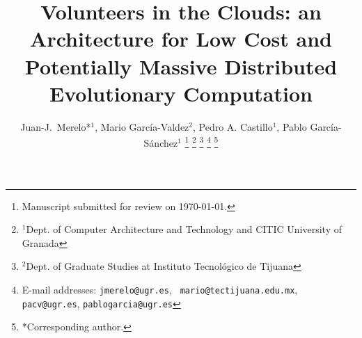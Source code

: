 \documentclass[journal,onecolumn]{IEEEtran}
\begin{document}
\title{Volunteers in the Clouds: an Architecture for Low Cost and
  Potentially Massive Distributed Evolutionary Computation}



\author{Juan-J.~Merelo*$^1$, Mario Garc\'ia-Valdez$^2$, Pedro A. Castillo$^1$, Pablo Garc\'ia-S\'anchez$^1$
\thanks{Manuscript submitted for review on \today.}%
\thanks{$^1$Dept. of Computer Architecture and Technology and CITIC University of Granada}%
\thanks{$^2$Dept. of Graduate Studies at Instituto Tecnol\'ogico de Tijuana}%
\thanks{E-mail addresses: {\tt jmerelo@ugr.es}, {\tt
    mario@tectijuana.edu.mx}, {\tt pacv@ugr.es}, {\tt pablogarcia@ugr.es}}%
\thanks{*Corresponding author.}%
}

\maketitle
\end{document}
